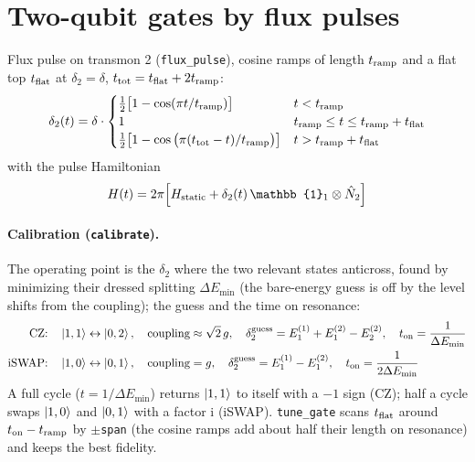 \documentclass[11pt]{article}
\newcommand{\ii}{\mathrm{i}}
\newcommand{\id}{\mathbb{1}}
\begin{document}
\section*{Two-qubit gates by flux pulses}
Flux pulse on transmon 2 (\texttt{flux\_pulse}), cosine ramps of length $t_{\rm ramp}$ and a flat
top $t_{\rm flat}$ at $\delta_2 = \delta$, $t_{\rm tot} = t_{\rm flat} + 2t_{\rm ramp}$:
\begin{equation}
  \delta_2(t) = \delta\cdot\begin{cases}
    \tfrac12\big[1 - \cos(\pi t/t_{\rm ramp})\big] & t < t_{\rm ramp} \\
    1 & t_{\rm ramp} \le t \le t_{\rm ramp} + t_{\rm flat} \\
    \tfrac12\big[1 - \cos\big(\pi(t_{\rm tot} - t)/t_{\rm ramp}\big)\big] & t > t_{\rm ramp} + t_{\rm flat}
  \end{cases}
\end{equation}
with the pulse Hamiltonian
\begin{equation}
  H(t) = 2\pi\Big[H_{\rm static} + \delta_2(t)\,\id_1\otimes\hat N_2\Big]
\end{equation}
\paragraph{Calibration (\texttt{calibrate}).}
The operating point is the $\delta_2$ where the two relevant states anticross, found by
minimizing their dressed splitting $\Delta E_{\min}$ (the bare-energy guess is off by the level
shifts from the coupling); the guess and the time on resonance:
\begin{align}
  \text{CZ:} \quad & \ket{1,1}\leftrightarrow\ket{0,2}, \quad \text{coupling} \approx \sqrt2\,g, \quad
  \delta_2^{\rm guess} = E^{(1)}_1 + E^{(2)}_1 - E^{(2)}_2, \quad t_{\rm on} = \frac{1}{\Delta E_{\min}} \\
  \text{iSWAP:} \quad & \ket{1,0}\leftrightarrow\ket{0,1}, \quad \text{coupling} = g, \quad
  \delta_2^{\rm guess} = E^{(1)}_1 - E^{(2)}_1, \quad t_{\rm on} = \frac{1}{2\Delta E_{\min}}
\end{align}
A full cycle ($t = 1/\Delta E_{\min}$) returns $\ket{1,1}$ to itself with a $-1$ sign (CZ); half a
cycle swaps $\ket{1,0}$ and $\ket{0,1}$ with a factor $\ii$ (iSWAP). \texttt{tune\_gate} scans
$t_{\rm flat}$ around $t_{\rm on} - t_{\rm ramp}$ by $\pm$\texttt{span} (the cosine ramps add
about half their length on resonance) and keeps the best fidelity.
\end{document}

